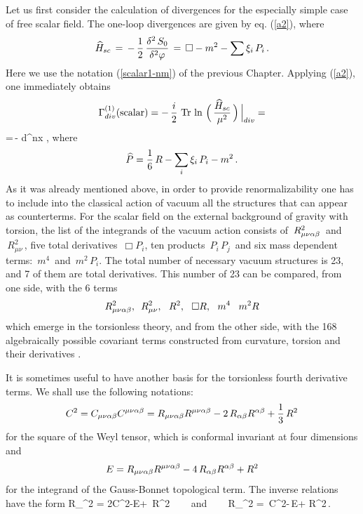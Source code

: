 Let us first consider the calculation of divergences 
for the especially simple case of free
scalar field. The one-loop divergences are given by  
eq. (\ref{a2}), where
$$
 {\widehat H}_{sc} \,=\,-\, 
\frac12\,\frac{\delta^2\,S_{0}}{\delta^2\varphi}
\,=\,  {\Box} - m^2 - \sum \xi_i\,P_i\,.
$$
Here we use the notation (\ref{scalar1-nm}) 
of the previous Chapter. 
Applying (\ref{a2}), one immediately obtains
$$
\Gamma^{(1)}_{div}({\rm scalar}) = -\,\frac{i}{2}\,\,\mbox{Tr}\,\ln\, 
\Big(\,\frac{{\widehat H}_{sc}}{\mu^2} \,\Big)\,\Big|_{div} =
$$
\beq 
=\,-\,\,\int d^nx\,\,,
\label{scalardivs}
\eeq
where 
$$
{\widehat P} = \frac16\,R - \sum_i\xi_i\,P_i - m^2\,.
$$
As it was already mentioned above, in order to provide 
renormalizability one has to include into the classical 
action of vacuum all the structures that can appear as 
counterterms. For the scalar field 
on the external background of gravity with torsion,
the list of the integrands of the vacuum action consists 
of $\,R_{\mu\nu\alpha\beta}^2\,$ and  $\,R_{\mu\nu}^2\,$, 
five total derivatives $\,{\Box}P_i$, ten products 
$\,P_i\,P_j\,$ and six mass dependent terms: 
$\,m^4\,$ and $\,m^2\,P_i$. The total number of necessary
vacuum structures is 23, and 7 of them are total 
derivatives. 
This number of 23 can be compared, from one side, 
with the 6 terms 
$$
R_{\mu\nu\alpha\beta}^2,\,\,\,R_{\mu\nu}^2,\,\,\,\,
R^2,\,\,\,\,\Box R, \,\,\,\,m^4\,\,\,\,\,m^2R
$$ 
which emerge
in the torsionless theory, and from the other side,
with the 168 algebraically possible covariant terms 
constructed from curvature, torsion 
and their derivatives \cite{chris}.

It is sometimes useful to have another basis for the 
torsionless fourth derivative terms. We shall use the 
following notations:
$$
C^2 = C_{\mu\nu\alpha\beta}C^{\mu\nu\alpha\beta} =
R_{\mu\nu\alpha\beta}R^{\mu\nu\alpha\beta} - 2 \,R_{\alpha\beta}R^{\alpha\beta} +
\frac13\,R^2
$$
for the square of the Weyl tensor, which is conformal invariant 
at four dimensions and
$$
E = 
R_{\mu\nu\alpha\beta}R^{\mu\nu\alpha\beta} - 
4 \,R_{\alpha\beta}R^{\alpha\beta} + R^2
$$
for the integrand of the Gauss-Bonnet topological term. 
The inverse relations have the form
\beq
R_{\mu\nu\al\be}^2 = 2C^2-E+\, R^2
\,\,\,\,\,\,\,\,\, {\rm and} \,\,\,\,\,\,\,\,\,
R_{\mu\nu}^2 = \,C^2-\,E+ R^2\,.
\label{basis}
\eeq


